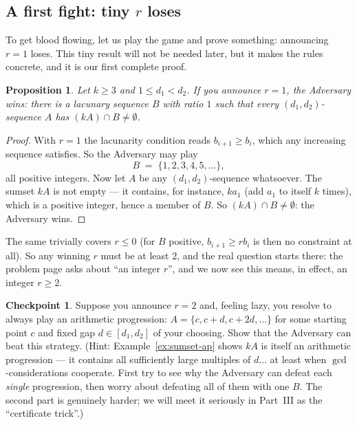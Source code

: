 \documentclass[11pt,reqno]{amsart}
\theoremstyle{plain}
\newtheorem{proposition}[theorem]{Proposition}
\theoremstyle{definition}
\newtheorem{checkpoint}[theorem]{Checkpoint}   %
\theoremstyle{remark}
\begin{document}
\subsection{A first fight: tiny \texorpdfstring{$r$}{r} loses}\label{sec:first-fight}

To get blood flowing, let us play the game and prove something: announcing $r = 1$
loses. This tiny result will not be needed later, but it makes the rules concrete, and
it is our first complete proof.

\begin{proposition}\label{prop:r1}
Let $k \ge 3$ and $1 \le d_1 < d_2$. If you announce $r = 1$, the Adversary wins:
there is a lacunary sequence $B$ with ratio $1$ such that every $(d_1,d_2)$-sequence
$A$ has $(kA) \cap B \ne \emptyset$.
\end{proposition}

\begin{proof}
With $r = 1$ the lacunarity condition reads $b_{i+1} \ge b_i$, which any increasing
sequence satisfies. So the Adversary may play
\[
  B \;=\; \{1, 2, 3, 4, 5, \dots\},
\]
all positive integers. Now let $A$ be any $(d_1,d_2)$-sequence whatsoever. The sumset
$kA$ is not empty --- it contains, for instance, $k a_1$ (add $a_1$ to itself $k$
times), which is a positive integer, hence a member of $B$. So
$(kA) \cap B \ne \emptyset$: the Adversary wins.
\end{proof}

The same trivially covers $r \le 0$ (for $B$ positive, $b_{i+1} \ge r b_i$ is then no
constraint at all). So any winning $r$ must be at least $2$, and the real question
starts there: the problem page asks about ``an integer $r$'', and we now see this
means, in effect, an integer $r \ge 2$.

\begin{checkpoint}
Suppose you announce $r = 2$ and, feeling lazy, you resolve to always play an
arithmetic progression: $A = \{c, c+d, c+2d, \dots\}$ for some starting point $c$ and
fixed gap $d \in [d_1, d_2]$ of your choosing. Show that the Adversary can beat this
strategy. (Hint: Example~\ref{ex:sumset-ap} shows $kA$ is itself an arithmetic
progression --- it contains all sufficiently large multiples of $d$... at least when
$\gcd$-considerations cooperate. First try to see why the Adversary can defeat each
\emph{single} progression, then worry about defeating all of them with one $B$. The
second part is genuinely harder; we will meet it seriously in Part~III as the
``certificate trick''.)
\end{checkpoint}
\end{document}
